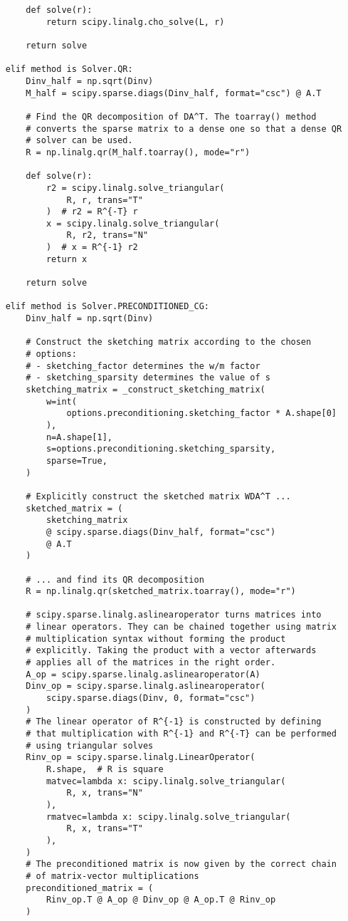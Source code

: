 \begin{verbatim}
        def solve(r):
            return scipy.linalg.cho_solve(L, r)

        return solve

    elif method is Solver.QR:
        Dinv_half = np.sqrt(Dinv)
        M_half = scipy.sparse.diags(Dinv_half, format="csc") @ A.T

        # Find the QR decomposition of DA^T. The toarray() method
        # converts the sparse matrix to a dense one so that a dense QR
        # solver can be used.
        R = np.linalg.qr(M_half.toarray(), mode="r")

        def solve(r):
            r2 = scipy.linalg.solve_triangular(
                R, r, trans="T"
            )  # r2 = R^{-T} r
            x = scipy.linalg.solve_triangular(
                R, r2, trans="N"
            )  # x = R^{-1} r2
            return x

        return solve

    elif method is Solver.PRECONDITIONED_CG:
        Dinv_half = np.sqrt(Dinv)

        # Construct the sketching matrix according to the chosen
        # options:
        # - sketching_factor determines the w/m factor
        # - sketching_sparsity determines the value of s
        sketching_matrix = _construct_sketching_matrix(
            w=int(
                options.preconditioning.sketching_factor * A.shape[0]
            ),
            n=A.shape[1],
            s=options.preconditioning.sketching_sparsity,
            sparse=True,
        )

        # Explicitly construct the sketched matrix WDA^T ...
        sketched_matrix = (
            sketching_matrix
            @ scipy.sparse.diags(Dinv_half, format="csc")
            @ A.T
        )

        # ... and find its QR decomposition
        R = np.linalg.qr(sketched_matrix.toarray(), mode="r")

        # scipy.sparse.linalg.aslinearoperator turns matrices into
        # linear operators. They can be chained together using matrix
        # multiplication syntax without forming the product
        # explicitly. Taking the product with a vector afterwards
        # applies all of the matrices in the right order.
        A_op = scipy.sparse.linalg.aslinearoperator(A)
        Dinv_op = scipy.sparse.linalg.aslinearoperator(
            scipy.sparse.diags(Dinv, 0, format="csc")
        )
        # The linear operator of R^{-1} is constructed by defining
        # that multiplication with R^{-1} and R^{-T} can be performed
        # using triangular solves
        Rinv_op = scipy.sparse.linalg.LinearOperator(
            R.shape,  # R is square
            matvec=lambda x: scipy.linalg.solve_triangular(
                R, x, trans="N"
            ),
            rmatvec=lambda x: scipy.linalg.solve_triangular(
                R, x, trans="T"
            ),
        )
        # The preconditioned matrix is now given by the correct chain
        # of matrix-vector multiplications
        preconditioned_matrix = (
            Rinv_op.T @ A_op @ Dinv_op @ A_op.T @ Rinv_op
        )


\end{verbatim}
